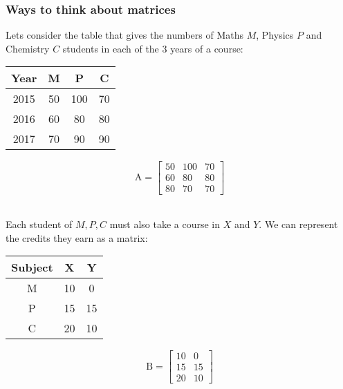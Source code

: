 \documentclass[a4paper, 9pt]{extarticle}
\begin{document}
\subsubsection{Ways to think about matrices}
Lets consider the table that gives the numbers of Maths $M$, Physics $P$ and Chemistry $C$ students in each of the 3 years of a course: \\[2ex]
\begin{minipage}{0.5\textwidth}
  \begin{center}
    \begin{tabularx}{0.6\textwidth}{c | c c c}
      \toprule
      Year & M  & P   & C  \\
      \midrule
      2015 & 50 & 100 & 70 \\
      2016 & 60 & 80  & 80 \\
      2017 & 70 & 90  & 90 \\
      \bottomrule
    \end{tabularx}
  \end{center}
\end{minipage}
\begin{minipage}{0.5\textwidth}
  \begin{center}
    $$\mathrm{A}=
      \begin{bmatrix}
        50 & 100 & 70 \\
        60 & 80  & 80 \\
        80 & 70  & 70
      \end{bmatrix}
    $$
  \end{center}
\end{minipage} \\[2ex]
Each student of $M, P, C$ must also take a course in $X$ and $Y$. We can represent the credits they earn as a matrix: \\[2ex]
\begin{minipage}
  {0.5\textwidth}
  \begin{center}
    \begin{tabularx}{0.6\textwidth}{c | c c}
      \toprule
      Subject & X  & Y  \\
      \midrule
      M       & 10 & 0  \\
      P       & 15 & 15 \\
      C       & 20 & 10 \\
      \bottomrule
    \end{tabularx}
  \end{center}
\end{minipage}
\begin{minipage}{0.5\textwidth}
  \begin{center}
    $$\mathrm{B}=
      \begin{bmatrix}
        10 & 0  \\
        15 & 15 \\
        20 & 10
      \end{bmatrix}
    $$
  \end{center}
\end{minipage} \\[2ex]
\end{document}
